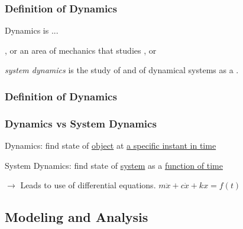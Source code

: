 \documentclass[fleqn]{beamer} %
\newcommand{\sectionIsubsectionItitle}{Definition of Dynamics}
\newcommand{\sectionIsubsectionIItitle}{Modeling and Analysis}
\begin{document}
			\begin{frame}
				\frametitle{\sectionIsubsectionItitle}
				\bigskip

				\large
				Dynamics is ...\vspcc

				\underline{\hspace{80mm}}, \vspcc
				or \vspcc
				an area of mechanics that studies \underline{\hspace{40mm}},\vspcc
				or \vspcc

				{\it system dynamics} is the study of \underline{\hspace{30mm}} and \underline{\hspace{30mm}} of dynamical systems as a \underline{\hspace{50mm}}.\vspc

				\btVFill
			\end{frame}

			\begin{frame}
				\frametitle{\sectionIsubsectionItitle}
				\bigskip

				\frametitle{Dynamics vs System Dynamics}

				\large
				Dynamics: find state of \underline{object} at \underline{a specific instant in time} \vspccc

				System Dynamics: find state of \underline{system} as a \underline{function of time}  \vspccc

				$\rightarrow$ Leads to use of differential equations. $m\ddot{x}+c\dot{x}+kx=f(t)$

				\btVFill
			\end{frame}

		\subsection{\sectionIsubsectionIItitle}\label{sectionIsubsectionII}
\end{document}
